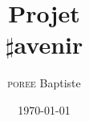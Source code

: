 \newcommand{\VRule}{\rule{5cm}{.5mm}}
\newcommand{\blap}[1]{\vbox to 0pt{#1\vss}}


\newcommand\AtUpperLeftCorner[3]{%
	\put(\LenToUnit{#1},\LenToUnit{\dimexpr\paperheight-#2}){\blap{#3}}%
}
\newcommand\AtUpperRightCorner[3]{%
	\put(\LenToUnit{\dimexpr\paperwidth-#1},\LenToUnit{\dimexpr\paperheight-#2}){\blap{\llap{#3}}}%
}	


\title{\LARGE{Projet \\ $\sharp$avenir}}
\author{\textsc{poree} Baptiste}
\newcommand{\ecole}[1]{\LARGE{Travail de Groupe}}%
\newcommand{\anneFormationUn}[1]{\large{Constrution du Projet \\ #1}}%
\newcommand{\diplome}[1]{\large{#1}}%
\date{\today}
\makeatletter